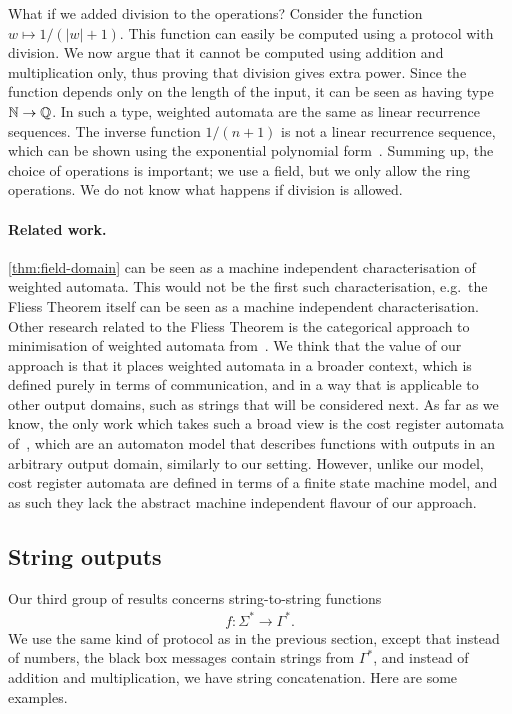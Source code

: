 \begin{myexample}[Division]\label{ex:division} What if we added division to the operations?  Consider the function  $w \mapsto 1/(|w|+1)$. This function can easily be computed using a protocol with division. We now argue that it cannot be computed using addition and multiplication only, thus proving that division gives extra power. Since the function depends only on the length of the input, it can be seen as having type ${\mathbb N} \to {\mathbb Q}$. In such a type, weighted automata are the same as linear recurrence sequences. The inverse function $1/(n+1)$ is not a  linear recurrence sequence, which can be shown using the exponential polynomial form~\cite[Theorem 2.1]{BerstelReutenauer08}. Summing up, the choice of operations is important; we use a field, but we only allow the ring operations. We do not know what happens if division is allowed.
\end{myexample}

\paragraph*{Related work.} \cref{thm:field-domain} can be seen as a machine independent characterisation of  weighted automata. This would not be the first such characterisation, e.g.~the Fliess Theorem itself can be seen as a machine independent characterisation. Other research related to the Fliess Theorem is the categorical approach to  minimisation of weighted automata from~\cite{colcombetPetrisan2017}. We think that the value of our approach is that it places weighted automata in a broader context, which is defined purely in terms of communication, and in a way that is applicable to  other output domains, such as strings that will be considered next. As far as we know, the only  work  which takes such a broad view is the cost register automata of~\cite[Section C]{alurDantoniDeshmukhYuan2013}, which are an automaton model that describes functions with outputs in an arbitrary output domain, similarly to our setting. However, unlike our model, cost register automata are defined in terms of a  finite state machine model, and as such they lack the abstract machine independent flavour of our approach.

\subsection{String outputs}
\label{sec:intro-strings}

Our third group of results concerns string-to-string functions
\begin{align*}
f : \Sigma^* \to \Gamma^*.
\end{align*}
We  use the same kind of protocol as in the previous section, except that instead of numbers, the black box messages  contain strings from $\Gamma^*$, and instead of addition and multiplication, we have string concatenation.  Here are some examples.

